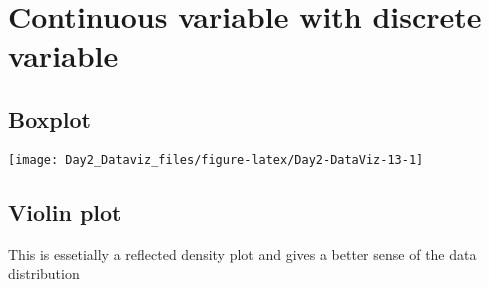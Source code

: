 \documentclass[12pt,letterpaperpaper,openany]{book}
\newenvironment{Shaded}{\begin{snugshade}}{\end{snugshade}}
\newcommand{\DataTypeTok}[1]{\textcolor[rgb]{0.13,0.29,0.53}{#1}}
\newcommand{\KeywordTok}[1]{\textcolor[rgb]{0.13,0.29,0.53}{\textbf{#1}}}
\newcommand{\NormalTok}[1]{#1}
\newcommand{\OperatorTok}[1]{\textcolor[rgb]{0.81,0.36,0.00}{\textbf{#1}}}
\newcommand{\StringTok}[1]{\textcolor[rgb]{0.31,0.60,0.02}{#1}}
\begin{document}
\hypertarget{continuous-variable-with-discrete-variable}{%
\section{Continuous variable with discrete variable}\label{continuous-variable-with-discrete-variable}}

\hypertarget{boxplot}{%
\subsection{Boxplot}\label{boxplot}}

\begin{Shaded}
\end{Shaded}

\texttt{[image: Day2\_Dataviz\_files/figure-latex/Day2-DataViz-13-1]}

\hypertarget{violin-plot}{%
\subsection{Violin plot}\label{violin-plot}}

This is essetially a reflected density plot and gives a better sense of the data distribution

\begin{Shaded}
\end{Shaded}
\end{document}
